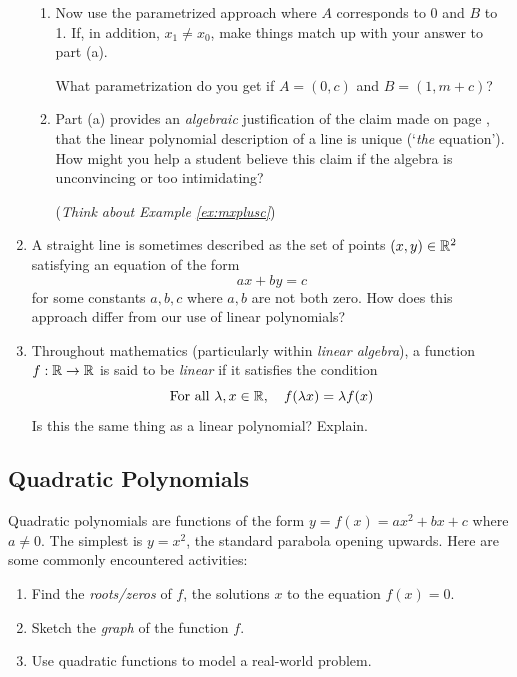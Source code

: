 \begin{exercises}{}{}
\begin{enumerate}
\begin{enumerate}
      \item Now use the parametrized approach where $A$ corresponds to 0 and $B$ to 1. If, in addition, $x_1\neq x_0$, make things match up with your answer to part (a).\par
      What parametrization do you get if $A=(0,c)$ and $B=(1,m+c)$?
	  
			\item Part (a) provides an \emph{algebraic} justification of the claim made on page \pageref{pg:paramline}, that the linear polynomial description of a line is unique (`\emph{the} equation'). How might you help a student believe this claim if the algebra is unconvincing or too intimidating?\par
			(\emph{Think about Example \ref{ex:mxplusc}})
    \end{enumerate}
        
    
    \item A straight line is sometimes described as the set of points $(x,y)\in\mathbb{R}^2$ satisfying an equation of the form
    \[
    	ax+by=c
    \]
    for some constants $a,b,c$ where $a,b$ are not both zero. How does this approach differ from our use of linear polynomials?
    
    
    \item Throughout mathematics (particularly within \emph{linear algebra}), a function $f:\mathbb{R}\to\mathbb{R}$ is said to be \emph{linear} if it satisfies the condition
    \[
    	\text{For all }\lambda,x\in\mathbb{R},\quad f(\lambda x)=\lambda f(x)
    \]
    Is this the same thing as a linear polynomial? Explain.
   
  \end{enumerate}
\end{exercises}



\clearpage



\subsection{Quadratic Polynomials}

Quadratic polynomials are functions of the form $y=f(x)=ax^2+bx+c$ where $a\neq 0$. The simplest is $y=x^2$, the standard parabola opening upwards. Here are some commonly encountered activities:
\begin{enumerate}\itemsep0pt
  \item Find the \emph{roots/zeros} of $f$, the solutions $x$ to the equation $f(x)=0$.
  \item Sketch the \emph{graph} of the function $f$.
  \item Use quadratic functions to model a real-world problem.
\end{enumerate}

